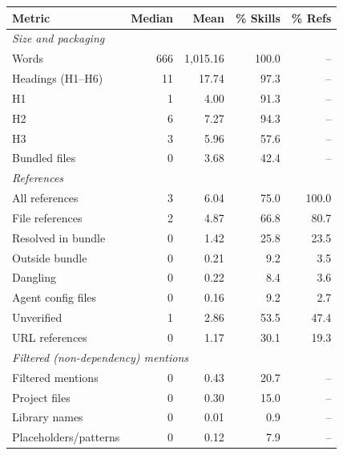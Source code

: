 \begin{tabular}{lrrrr}
\toprule
\textbf{Metric} & \textbf{Median} & \textbf{Mean} & \textbf{\% Skills} & \textbf{\% Refs} \\
\midrule
\multicolumn{5}{l}{\textit{Size and packaging}} \\
Words & 666 & 1,015.16 & 100.0 & -- \\
Headings (H1--H6) & 11 & 17.74 & 97.3 & -- \\
\quad H1 & 1 & 4.00 & 91.3 & -- \\
\quad H2 & 6 & 7.27 & 94.3 & -- \\
\quad H3 & 3 & 5.96 & 57.6 & -- \\
Bundled files & 0 & 3.68 & 42.4 & -- \\
\midrule
\multicolumn{5}{l}{\textit{References}} \\
All references & 3 & 6.04 & 75.0 & 100.0 \\
\quad File references & 2 & 4.87 & 66.8 & 80.7 \\
\qquad Resolved in bundle & 0 & 1.42 & 25.8 & 23.5 \\
\qquad Outside bundle & 0 & 0.21 & 9.2 & 3.5 \\
\qquad Dangling & 0 & 0.22 & 8.4 & 3.6 \\
\qquad Agent config files & 0 & 0.16 & 9.2 & 2.7 \\
\qquad Unverified & 1 & 2.86 & 53.5 & 47.4 \\
\quad URL references & 0 & 1.17 & 30.1 & 19.3 \\
\midrule
\multicolumn{5}{l}{\textit{Filtered (non-dependency) mentions}} \\
Filtered mentions & 0 & 0.43 & 20.7 & -- \\
\quad Project files & 0 & 0.30 & 15.0 & -- \\
\quad Library names & 0 & 0.01 & 0.9 & -- \\
\quad Placeholders/patterns & 0 & 0.12 & 7.9 & -- \\
\bottomrule
\end{tabular}
